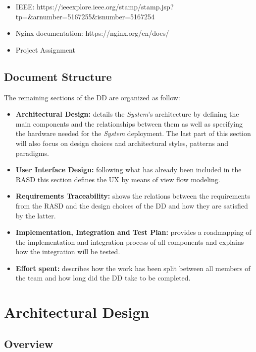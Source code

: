 \documentclass[titlepage]{article}
\begin{document}
\begin{itemize}
	\item IEEE: https://ieeexplore.ieee.org/stamp/stamp.jsp?tp=\&arnumber=5167255\&isnumber=5167254
	\item Nginx documentation: https://nginx.org/en/docs/
	\item Project Assignment
\end{itemize}


\subsection{Document Structure}
The remaining sections of the DD are organized as follow:
    \begin{itemize}
        \item {\bf Architectural Design: }details the {\it System}’s architecture by defining the main components and the relationships between them as well as specifying the hardware needed for the {\it System} deployment. The last part of this section will also focus on design choices and architectural styles, patterns and paradigms.
		\item {\bf User Interface Design:  }following what has already been included in the RASD this section defines the UX by means of view flow modeling.
		\item {\bf Requirements Traceability: }shows the relations between the requirements from the RASD and the design choices of the DD and how they are satisfied by the latter.
		\item {\bf Implementation, Integration and Test Plan: }provides a roadmapping of the implementation and integration process of all components and explains how the integration will be tested.
		\item {\bf Effort spent: }describes how the work has been split between all members of the team and how long did the DD take to be completed.
    \end{itemize}
\pagebreak



\section{Architectural Design}
\subsection{Overview}
\end{document}
